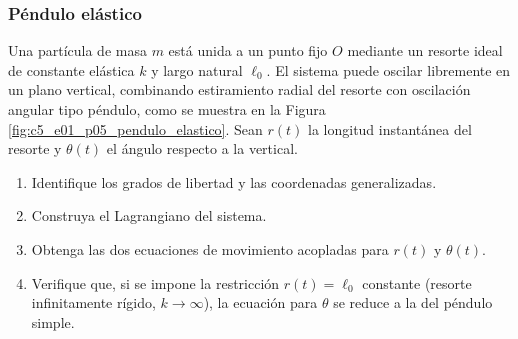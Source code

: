 \subsubsection{Péndulo elástico}

Una partícula de masa $m$ está unida a un punto fijo $O$ mediante un resorte ideal de constante elástica $k$ y largo natural $\ell_0$. El sistema puede oscilar libremente en un plano vertical, combinando estiramiento radial del resorte con oscilación angular tipo péndulo, como se muestra en la Figura \ref{fig:c5_e01_p05_pendulo_elastico}. Sean $r(t)$ la longitud instantánea del resorte y $\theta(t)$ el ángulo respecto a la vertical.

\begin{enumerate}
    \item Identifique los grados de libertad y las coordenadas generalizadas.
    \item Construya el Lagrangiano del sistema.
    \item Obtenga las dos ecuaciones de movimiento acopladas para $r(t)$ y $\theta(t)$.
    \item Verifique que, si se impone la restricción $r(t) = \ell_0$ constante (resorte infinitamente rígido, $k\to\infty$), la ecuación para $\theta$ se reduce a la del péndulo simple.
\end{enumerate}

